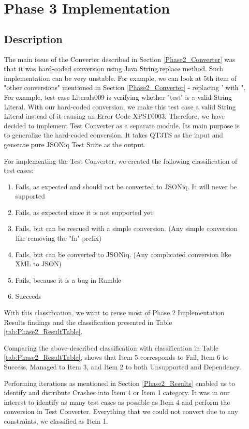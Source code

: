\section{Phase 3 Implementation}
\subsection{Description}
\label{Phase3_Description}
The main issue of the Converter described in Section \ref{Phase2_Converter} was that it was hard-coded conversion using Java String.replace method. Such implementation can be very unstable. For example, we can look at 5th item of "other conversions" mentioned in Section \ref{Phase2_Converter} - replacing ' with ". For example, test case Literals009 is verifying whether "test' is a valid String Literal. With our hard-coded conversion, we make this test case a valid String Literal instead of it causing an Error Code XPST0003. Therefore, we have decided to implement Test Converter as a separate module. Its main purpose is to generalize the hard-coded conversion. It takes QT3TS as the input and generate pure JSONiq Test Suite as the output.

For implementing the Test Converter, we created the following classification of test cases:
\begin{enumerate}
	\item Fails, as expected and should not be converted to JSONiq. It will never be supported
	\item Fails, as expected since it is not supported yet
	\item Fails, but can be rescued with a simple conversion. (Any simple conversion like removing the "fn" prefix)
	\item Fails, but can be converted to JSONiq. (Any complicated conversion like XML to JSON)
	\item Fails, because it is a bug in Rumble
	\item Succeeds
\end{enumerate}

With this classification, we want to reuse most of Phase 2 Implementation Results findings and the classification presented in Table \ref{tab:Phase2_ResultTable}.

Comparing the above-described classification with classification in Table \ref{tab:Phase2_ResultTable}, shows that Item 5 corresponds to Fail, Item 6 to Success, Managed to Item 3, and Item 2 to both Unsupported and Dependency. 

Performing iterations as mentioned in Section \ref{Phase2_Results} enabled us to identify and distribute Crashes into Item 4 or Item 1 category. It was in our interest to identify as many test cases as possible as Item 4 and perform the conversion in Test Converter. Everything that we could not convert due to any constraints, we classified as Item 1. 

